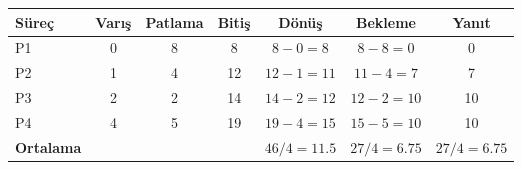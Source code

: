 \begin{tabular}{@{}lcccccc@{}}
\toprule
\textbf{Süreç} & \textbf{Varış} & \textbf{Patlama} & \textbf{Bitiş} & \textbf{Dönüş} & \textbf{Bekleme} & \textbf{Yanıt}\\
\midrule
P1 & 0 & 8 & 8 & $8-0=8$ & $8-8=0$ & 0\\
P2 & 1 & 4 & 12 & $12-1=11$ & $11-4=7$ & 7\\
P3 & 2 & 2 & 14 & $14-2=12$ & $12-2=10$ & 10\\
P4 & 4 & 5 & 19 & $19-4=15$ & $15-5=10$ & 10\\
\midrule
\textbf{Ortalama} &  &  &  & $46/4=11.5$ & $27/4=6.75$ & $27/4=6.75$\\
\bottomrule
\end{tabular}
